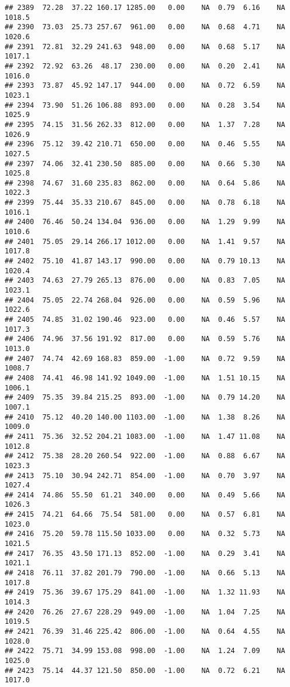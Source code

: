 \documentclass{article}\usepackage{graphicx, color}
\makeatletter
\newenvironment{kframe}{%
 \def\at@end@of@kframe{}%
 \ifinner\ifhmode%
  \def\at@end@of@kframe{\end{minipage}}%
  \begin{minipage}{\columnwidth}%
 \fi\fi%
 \def\FrameCommand##1{\hskip\@totalleftmargin \hskip-\fboxsep
 \colorbox{shadecolor}{##1}\hskip-\fboxsep
     \hskip-\linewidth \hskip-\@totalleftmargin \hskip\columnwidth}%
 \MakeFramed {\advance\hsize-\width
   \@totalleftmargin\z@ \linewidth\hsize
   \@setminipage}}%
 {\par\unskip\endMakeFramed%
 \at@end@of@kframe}
\newenvironment{knitrout}{}{} %
\makeatother
\begin{document}
\begin{knitrout}
\begin{kframe}
\begin{verbatim}
## 2389  72.28  37.22 160.17 1285.00   0.00    NA  0.79  6.16    NA 1018.5
## 2390  73.03  25.73 257.67  961.00   0.00    NA  0.68  4.71    NA 1020.6
## 2391  72.81  32.29 241.63  948.00   0.00    NA  0.68  5.17    NA 1017.1
## 2392  72.92  63.26  48.17  230.00   0.00    NA  0.20  2.41    NA 1016.0
## 2393  73.87  45.92 147.17  944.00   0.00    NA  0.72  6.59    NA 1023.1
## 2394  73.90  51.26 106.88  893.00   0.00    NA  0.28  3.54    NA 1025.9
## 2395  74.15  31.56 262.33  812.00   0.00    NA  1.37  7.28    NA 1026.9
## 2396  75.12  39.42 210.71  650.00   0.00    NA  0.46  5.55    NA 1027.5
## 2397  74.06  32.41 230.50  885.00   0.00    NA  0.66  5.30    NA 1025.8
## 2398  74.67  31.60 235.83  862.00   0.00    NA  0.64  5.86    NA 1022.3
## 2399  75.44  35.33 210.67  845.00   0.00    NA  0.78  6.18    NA 1016.1
## 2400  76.46  50.24 134.04  936.00   0.00    NA  1.29  9.99    NA 1010.6
## 2401  75.05  29.14 266.17 1012.00   0.00    NA  1.41  9.57    NA 1017.8
## 2402  75.10  41.87 143.17  990.00   0.00    NA  0.79 10.13    NA 1020.4
## 2403  74.63  27.79 265.13  876.00   0.00    NA  0.83  7.05    NA 1023.1
## 2404  75.05  22.74 268.04  926.00   0.00    NA  0.59  5.96    NA 1022.6
## 2405  74.85  31.02 190.46  923.00   0.00    NA  0.46  5.57    NA 1017.3
## 2406  74.96  37.56 191.92  817.00   0.00    NA  0.59  5.76    NA 1013.0
## 2407  74.74  42.69 168.83  859.00  -1.00    NA  0.72  9.59    NA 1008.7
## 2408  74.41  46.98 141.92 1049.00  -1.00    NA  1.51 10.15    NA 1006.1
## 2409  75.35  39.84 215.25  893.00  -1.00    NA  0.79 14.20    NA 1007.1
## 2410  75.12  40.20 140.00 1103.00  -1.00    NA  1.38  8.26    NA 1009.0
## 2411  75.36  32.52 204.21 1083.00  -1.00    NA  1.47 11.08    NA 1012.8
## 2412  75.38  28.20 260.54  922.00  -1.00    NA  0.88  6.67    NA 1023.3
## 2413  75.10  30.94 242.71  854.00  -1.00    NA  0.70  3.97    NA 1027.4
## 2414  74.86  55.50  61.21  340.00   0.00    NA  0.49  5.66    NA 1026.3
## 2415  74.21  64.66  75.54  581.00   0.00    NA  0.57  6.81    NA 1023.0
## 2416  75.20  59.78 115.50 1033.00   0.00    NA  0.32  5.73    NA 1021.5
## 2417  76.35  43.50 171.13  852.00  -1.00    NA  0.29  3.41    NA 1021.1
## 2418  76.11  37.82 201.79  790.00  -1.00    NA  0.66  5.13    NA 1017.8
## 2419  75.36  39.67 175.29  841.00  -1.00    NA  1.32 11.93    NA 1014.3
## 2420  76.26  27.67 228.29  949.00  -1.00    NA  1.04  7.25    NA 1019.5
## 2421  76.39  31.46 225.42  806.00  -1.00    NA  0.64  4.55    NA 1028.0
## 2422  75.71  34.99 153.08  998.00  -1.00    NA  1.24  7.09    NA 1025.0
## 2423  75.14  44.37 121.50  850.00  -1.00    NA  0.72  6.21    NA 1017.0

\end{verbatim}
\end{kframe}
\end{knitrout}
\end{document}
